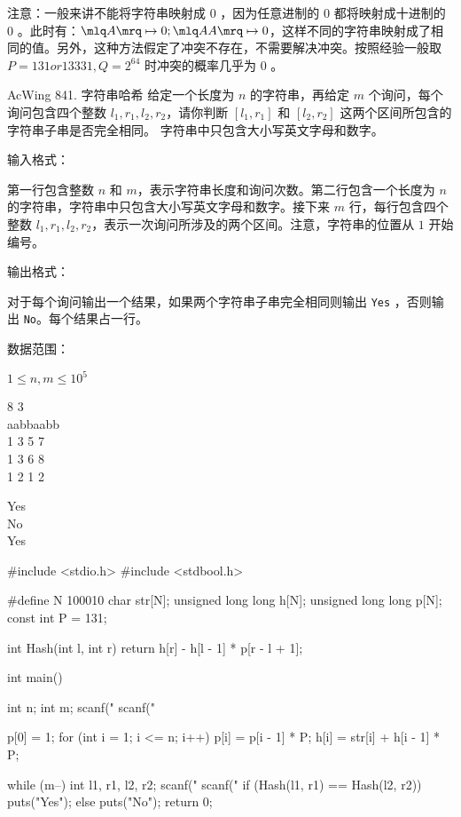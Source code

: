 注意：一般来讲不能将字符串映射成 $0$ ，因为任意进制的 $0$ 都将映射成十进制的 $0$ 。此时有：$\mlq A \mrq \mapsto 0; \mlq AA \mrq \mapsto 0$，这样不同的字符串映射成了相同的值。另外，这种方法假定了冲突不存在，不需要解决冲突。按照经验一般取 $P = 131 or 13331, Q = 2^{64}$ 时冲突的概率几乎为 $0$ 。

\begin{titledbox}{AcWing 841. 字符串哈希}
    给定一个长度为 $n$ 的字符串，再给定 $m$ 个询问，每个询问包含四个整数 $l_1, r_1, l_2, r_2$，请你判断 $[l_1, r_1]$ 和 $[l_2, r_2]$ 这两个区间所包含的字符串子串是否完全相同。
    字符串中只包含大小写英文字母和数字。

    输入格式：

    第一行包含整数 $n$ 和 $m$，表示字符串长度和询问次数。第二行包含一个长度为 $n$ 的字符串，字符串中只包含大小写英文字母和数字。接下来 $m$ 行，每行包含四个整数 $l_1, r_1, l_2, r_2$，表示一次询问所涉及的两个区间。注意，字符串的位置从 $1$ 开始编号。

    输出格式：

    对于每个询问输出一个结果，如果两个字符串子串完全相同则输出 \lstinline{Yes} ，否则输出 \lstinline{No}。每个结果占一行。

    数据范围：

    $1 \le n, m \le 10^5$

    \begin{inputblock}
        8 3 \\
        aabbaabb \\
        1 3 5 7 \\
        1 3 6 8 \\
        1 2 1 2
    \end{inputblock}
    \begin{outputblock}
        Yes \\
        No \\
        Yes
    \end{outputblock}
\end{titledbox}

\begin{mycpptwocol}[字符串前缀哈希法]
    #include <stdio.h>
    #include <stdbool.h>

    #define N 100010
    char str[N];
    unsigned long long h[N];
    unsigned long long p[N];
    const int P = 131;

    int Hash(int l, int r)
        {
        return h[r] - h[l - 1] * p[r - l + 1];
    }

    int main()
        {
        int n;
        int m;
        scanf("%
        scanf("%

        p[0] = 1;
        for (int i = 1; i <= n; i++) {
            p[i] = p[i - 1] * P;
            h[i] = str[i] + h[i - 1] * P;
        }

        while (m--) {
            int l1, r1, l2, r2;
            scanf("%
            scanf("%
            if (Hash(l1, r1) == Hash(l2, r2)) {
                puts("Yes");
            } else {
                puts("No");
            }
        }
        return 0;
    }
\end{mycpptwocol}

